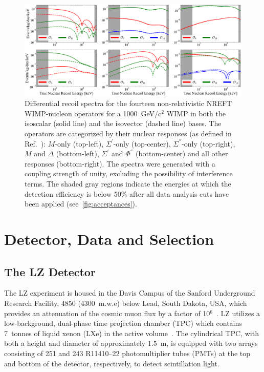 \documentclass[reprint, showpacs,
preprintnumbers,
amsmath,amssymb,
aps, floatfix,
superscriptaddress,
prd, nofootinbib]{revtex4-1}
\begin{document}
\begin{figure}[hbt!]
    \centering
    \includegraphics[trim={8 5 5 5},clip, width=\textwidth]{logx_logy_m1000GeV_recoils-4}
    \caption{
    Differential recoil spectra for the fourteen non-relativistic NREFT WIMP-nucleon operators for a 1000~GeV/c$^2$ WIMP in both the isoscalar (solid line) and the isovector (dashed line) bases.
    The operators are categorized by their nuclear responses (as defined in Ref.~\cite{Anand:MathematicaEFT}): $M$-only (top-left), $\Sigma^{'}$-only (top-center), $\Sigma^{''}$-only (top-right), $M$ and $\Delta$ (bottom-left), $\Sigma^{'}$ and $\Phi^{''}$ (bottom-center) and all other responses (bottom-right).
    The spectra were generated with a coupling strength of unity, excluding the possibility of interference terms. 
    The shaded gray regions indicate the energies at which the detection efficiency is below 50\% after all data analysis cuts have been applied (see~\autoref{fig:acceptances}).}
    \label{fig:recoils}
\end{figure}

        

\section{\label{sec:lz_data_selection} Detector, Data and Selection}
\subsection{\label{subsec:selection}The LZ Detector} 
The LZ experiment is housed in the Davis Campus of the Sanford Underground Research Facility, 4850 (4300~m.w.e) below Lead, South Dakota, USA, which provides an attenuation of the cosmic muon flux by a factor of 10$^6$~\cite{LZ:Experiment_2020,LZ:TDR_2017}.
LZ utilizes a low-background, dual-phase time projection chamber (TPC) which contains 7~tonnes of liquid xenon (LXe) in the active volume~\cite{LZ:Experiment_2020,LZ:TDR_2017}. 
The cylindrical TPC, with both a height and diameter of approximately 1.5~m, is equipped with two arrays consisting of 251 and 243 R11410–22 photomultiplier tubes (PMTs) at the top and bottom of the detector, respectively, to detect scintillation light. 
\end{document}
